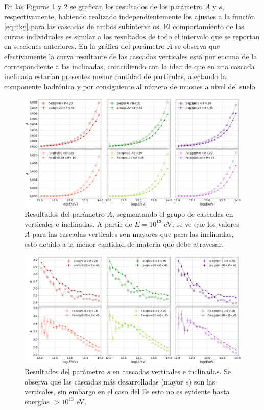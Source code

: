 	En las Figuras \ref{fig:theta_nkgA} y \ref{fig:theta_nkgs} se grafican los resultados de los par\'ametro $A$ y $s$, respectivamente, habiendo realizado independientemente los ajustes a la funci\'on \ref{eq:nkg} para las cascadas de ambos subintervalos. El comportamiento de las curvas individuales es similar a los resultados de todo el intervalo que se reportan en secciones anteriores. En la gr\'afica del par\'ametro $A$ se observa que efectivamente la curva resultante de las cascadas verticales est\'a por encima de la correspondiente a las inclinadas, coincidiendo con la idea de que en una cascada inclinada estar\'ian presentes menor cantidad de part\'iculas, afectando la componente hadr\'onica y por consiguiente al n\'umero de muones a nivel del suelo. \\
		\begin{figure} [h]
		\includegraphics[width=\textwidth]{Figuras/theta_nkgA}
		\caption{Resultados del par\'ametro $A$, segmentando el grupo de cascadas en verticales e inclinadas. A partir de $E=10^{13}$ eV, se ve que los valores $A$ para las cascadas verticales son mayores que para las inclinadas, esto debido a la menor cantidad de materia que debe atravesar.}
		\label{fig:theta_nkgA}
		\end{figure}
		
		\begin{figure} []
		\includegraphics[width=\textwidth]{Figuras/theta_nkgs}
		\caption{Resultados del par\'ametro $s$ en cascadas verticales e inclinadas. Se observa que las cascadas m\'as desarrolladas (mayor $s$) son las verticales, sin embargo en el caso del Fe esto no es evidente hasta energ\'ias $>10^{13}$ eV.}
		\label{fig:theta_nkgs}
		\end{figure}

